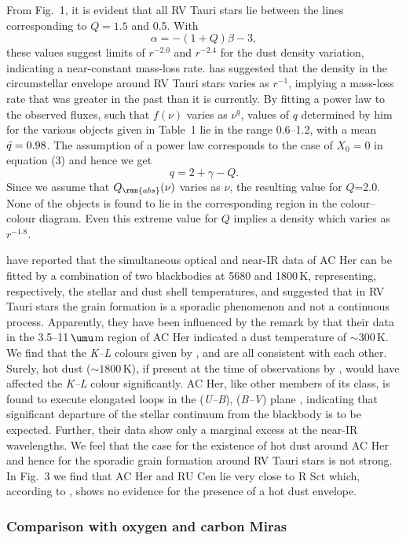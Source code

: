 \documentclass[useAMS,usedcolumn,usegraphicx,usenatbib]{mn2e}
\begin{document}
From Fig.~1, it is evident that all RV Tauri stars lie between the
lines corresponding to $Q=1.5$ and 0.5. With
 \[
  \alpha=-(1+Q)\beta-3,
 \]
 these values suggest limits of $r^{-2.0}$ and $r^{-2.4}$ for the
dust density variation, indicating a near-constant mass-loss rate.
\citet{b12} has suggested that the density in the circumstellar
envelope around RV Tauri stars varies as $r^{-1}$, implying a
mass-loss rate that was greater in the past than it is currently.
By fitting a power law to the observed fluxes, such that $f(\nu)$
varies as $\nu^q$, values of $q$ determined by him for the various
objects given in Table~1 lie in the range 0.6--1.2, with a mean
$\skew5\bar q=0.98$. The assumption of a power law corresponds to
the case of $X_0=0$ in equation (3) and hence we get
 \[
  q=2+\gamma -Q.
 \]
Since we assume that $Q_{\rmn{abs}}(\nu)$ varies as $\nu$, the
resulting value for $Q$=2.0. None of the objects is found to lie in the
corresponding region in the colour--colour diagram. Even this extreme
value for $Q$ implies a density which varies as $r^{-1.8}$.

\citet{b9} have reported that the simultaneous optical and near-IR
data of AC Her can be fitted by a combination of two blackbodies
at 5680 and 1800\,K, representing, respectively, the stellar and
dust shell temperatures, and suggested that in RV Tauri stars the
grain formation is a sporadic phenomenon and not a continuous
process. Apparently, they have been influenced by the remark by
\citet{b7} that their data in the 3.5--11$\,\umu$m region of AC
Her indicated a dust temperature of $\sim$300\,K. We find that the
{\it K--L\/} colours given by \citet{b5}, \citet{b15} and
\citet{b9} are all consistent with each other. Surely, hot dust
($\sim 1800\,$K), if present at the time of observations by
\citet{b9}, would have affected the {\it K--L\/} colour
significantly. AC Her, like other members of its class, is found
to execute elongated loops in the ({\it U--B\/}), ({\it B--V\/})
plane \citep{b20}, indicating that significant departure of the
stellar continuum from the blackbody is to be expected. Further,
their data show only a marginal excess at the near-IR wavelengths.
We feel that the case for the existence of hot dust around AC Her
and hence for the sporadic grain formation around RV Tauri stars
is not strong. In Fig.~3 we find that AC Her and RU Cen lie very
close to R Sct which, according to \citet{b9}, shows no evidence
for the presence of a hot dust envelope.

\subsubsection{Comparison with oxygen and carbon Miras}
\end{document}
